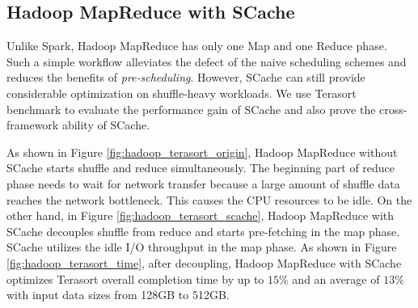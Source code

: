 {\color{black}
\subsection{Hadoop MapReduce with SCache}

{\color{black}
Unlike Spark, Hadoop MapReduce has only one Map and one Reduce phase.
Such a simple workflow alleviates the defect of the naive scheduling schemes and reduces the benefits of \textit{pre-scheduling}.
However, SCache can still provide considerable optimization on shuffle-heavy workloads.
We use Terasort benchmark to evaluate the performance gain of SCache and also prove the cross-framework ability of SCache.
}

As shown in Figure \ref{fig:hadoop_terasort_origin}, Hadoop MapReduce without SCache starts shuffle and reduce simultaneously.
The beginning part of reduce phase needs to wait for network transfer because a large amount of shuffle data reaches the network bottleneck.
This causes the CPU resources to be idle. 
On the other hand, in Figure \ref{fig:hadoop_terasort_scache}, Hadoop MapReduce with SCache decouples shuffle from reduce and starts pre-fetching in the map phase.
SCache utilizes the idle I/O throughput in the map phase.
As shown in Figure \ref{fig:hadoop_terasort_time}, after decoupling, Hadoop MapReduce with SCache optimizes Terasort overall completion time by up to $15\%$ and an average of $13\%$ with input data sizes from 128GB to 512GB.
}

